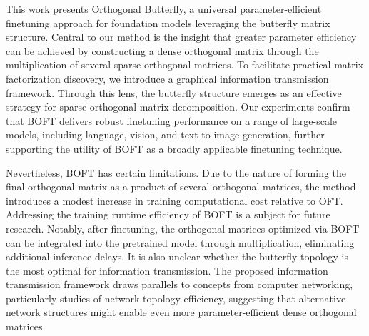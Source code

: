This work presents Orthogonal Butterfly, a universal parameter-efficient finetuning approach for foundation models leveraging the butterfly matrix structure. Central to our method is the insight that greater parameter efficiency can be achieved by constructing a dense orthogonal matrix through the multiplication of several sparse orthogonal matrices. To facilitate practical matrix factorization discovery, we introduce a graphical information transmission framework. Through this lens, the butterfly structure emerges as an effective strategy for sparse orthogonal matrix decomposition. Our experiments confirm that BOFT delivers robust finetuning performance on a range of large-scale models, including language, vision, and text-to-image generation, further supporting the utility of BOFT as a broadly applicable finetuning technique.

Nevertheless, BOFT has certain limitations. Due to the nature of forming the final orthogonal matrix as a product of several orthogonal matrices, the method introduces a modest increase in training computational cost relative to OFT. Addressing the training runtime efficiency of BOFT is a subject for future research. Notably, after finetuning, the orthogonal matrices optimized via BOFT can be integrated into the pretrained model through multiplication, eliminating additional inference delays. It is also unclear whether the butterfly topology is the most optimal for information transmission. The proposed information transmission framework draws parallels to concepts from computer networking, particularly studies of network topology efficiency, suggesting that alternative network structures might enable even more parameter-efficient dense orthogonal matrices.